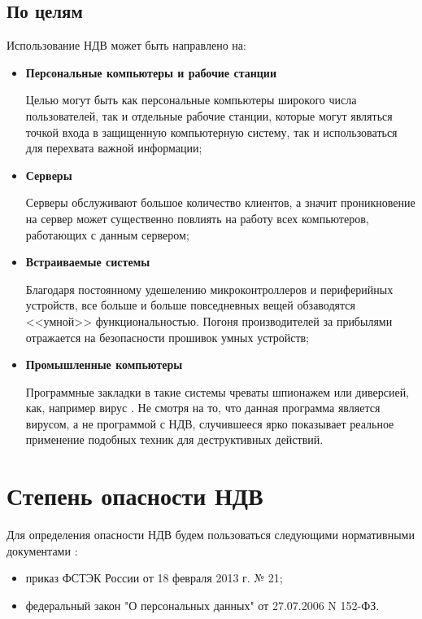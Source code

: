 \subsection{По целям}\label{sec:ch1/sec2/sub2}
Использование НДВ может быть направлено на:
\begin{itemize}
    \item \textbf{Персональные компьютеры и рабочие станции}
          
          Целью могут быть как персональные компьютеры широкого числа пользователей,
          так и отдельные рабочие станции, которые могут являться точкой входа в
          защищенную компьютерную систему, так и использоваться для перехвата важной
          информации;
    \item \textbf{Серверы}
          
          Серверы обслуживают большое количество клиентов, а значит проникновение на
          сервер может существенно повлиять на работу всех компьютеров, работающих с
          данным сервером;
    \item \textbf{Встраиваемые системы}

          Благодаря постоянному удешелению микроконтроллеров и периферийных устройств,
          все больше и больше повседневных вещей обзаводятся <<умной>> функциональностью.
          Погоня производителей за прибылями отражается на безопасности прошивок умных устройств;
    \item \textbf{Промышленные компьютеры}

        Программные закладки в такие системы чреваты шпионажем или диверсией, как, например
        вирус \autocite{stuxnet}. Не смотря на то, что данная программа является вирусом, а
        не программой с НДВ, случившееся ярко показывает реальное применение подобных техник 
        для деструктивных действий.
\end{itemize}

\section{Степень опасности НДВ}\label{sec:ch1/sec3}
Для определения опасности НДВ будем пользоваться следующими нормативными документами \autocite{fstec-21-blog}:
\begin{itemize}
    \item приказ ФСТЭК России от 18 февраля 2013 г. № 21;
    \item федеральный закон "О персональных данных" от 27.07.2006 N 152-ФЗ.
\end{itemize}

